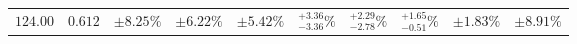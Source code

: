 \begin{table}[ht!]
{{\begin{tabular}{| cc | ccc | cccc | c |}
$124.00$ & $0.612$ & $\pm8.25\%$ & {\color{black!55}$\pm 6.22\%$} & {\color{black!55}$\pm 5.42\%$} & $^{+3.36}_{-3.36}\%$ & {\color{black!55}$^{+2.29}_{-2.78}\%$} & {\color{black!55}$^{+1.65}_{-0.51}\%$} & {\color{black!55}$\pm 1.83\%$} & $\pm8.91\%$  \\

\end{tabular}}}
\end{table}
